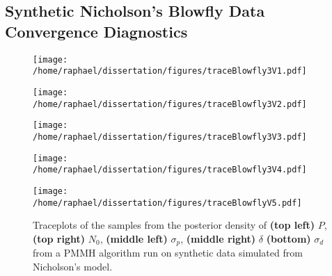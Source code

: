 \documentclass[12pt]{article}
\begin{document}
\begin{appendices}
	\subsection{Synthetic Nicholson's Blowfly Data Convergence Diagnostics} \label{diagNicholsonSynthe}
	\begin{figure}[htb]
		\centering
		\begin{minipage}{0.49\textwidth}
			\centering
			\texttt{[image: /home/raphael/dissertation/figures/traceBlowfly3V1.pdf]}
		\end{minipage}
		\begin{minipage}{0.49\textwidth}
			\centering
			\texttt{[image: /home/raphael/dissertation/figures/traceBlowfly3V2.pdf]}
		\end{minipage}
		\begin{minipage}{0.49\textwidth}
			\centering
			\texttt{[image: /home/raphael/dissertation/figures/traceBlowfly3V3.pdf]}
		\end{minipage}
		\begin{minipage}{0.49\textwidth}
			\centering
			\texttt{[image: /home/raphael/dissertation/figures/traceBlowfly3V4.pdf]}
		\end{minipage}
		\begin{minipage}{0.49\textwidth}
			\centering
			\texttt{[image: /home/raphael/dissertation/figures/traceBlowflyV5.pdf]}
		\end{minipage}
		\caption[Traceplots of a run of a PMMH sampler run on synthetic data, Nicholson's model]{Traceplots of the samples from the posterior density of \textbf{(top left)} $P$, \textbf{(top right)} $N_0$,  \textbf{(middle left)} $\sigma_p$,  \textbf{(middle right)} $\delta$ \textbf{(bottom)} $\sigma_d$ from a PMMH algorithm run on synthetic data simulated from Nicholson's model.} 
		\label{fig:traceBlowfly}
	\end{figure}


\end{appendices}
\end{document}

